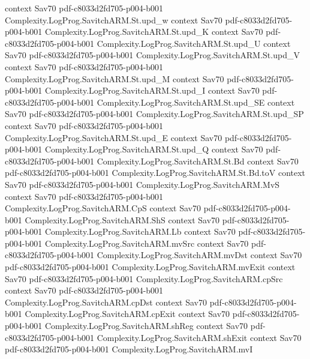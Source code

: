 \begin{theorem}
  {context}
  {Sav70}
  {pdf-c8033d2fd705-p004-b001}
\proofstep
  {Complexity.LogProg.SavitchARM.St.upd_w}
  {context}
  {Sav70}
  {pdf-c8033d2fd705-p004-b001}
\proofstep
  {Complexity.LogProg.SavitchARM.St.upd_K}
  {context}
  {Sav70}
  {pdf-c8033d2fd705-p004-b001}
\proofstep
  {Complexity.LogProg.SavitchARM.St.upd_U}
  {context}
  {Sav70}
  {pdf-c8033d2fd705-p004-b001}
\proofstep
  {Complexity.LogProg.SavitchARM.St.upd_V}
  {context}
  {Sav70}
  {pdf-c8033d2fd705-p004-b001}
\proofstep
  {Complexity.LogProg.SavitchARM.St.upd_M}
  {context}
  {Sav70}
  {pdf-c8033d2fd705-p004-b001}
\proofstep
  {Complexity.LogProg.SavitchARM.St.upd_I}
  {context}
  {Sav70}
  {pdf-c8033d2fd705-p004-b001}
\proofstep
  {Complexity.LogProg.SavitchARM.St.upd_SE}
  {context}
  {Sav70}
  {pdf-c8033d2fd705-p004-b001}
\proofstep
  {Complexity.LogProg.SavitchARM.St.upd_SP}
  {context}
  {Sav70}
  {pdf-c8033d2fd705-p004-b001}
\proofstep
  {Complexity.LogProg.SavitchARM.St.upd_E}
  {context}
  {Sav70}
  {pdf-c8033d2fd705-p004-b001}
\proofstep
  {Complexity.LogProg.SavitchARM.St.upd_Q}
  {context}
  {Sav70}
  {pdf-c8033d2fd705-p004-b001}
\proofstep
  {Complexity.LogProg.SavitchARM.St.Bd}
  {context}
  {Sav70}
  {pdf-c8033d2fd705-p004-b001}
\proofstep
  {Complexity.LogProg.SavitchARM.St.Bd.toV}
  {context}
  {Sav70}
  {pdf-c8033d2fd705-p004-b001}
\proofstep
  {Complexity.LogProg.SavitchARM.MvS}
  {context}
  {Sav70}
  {pdf-c8033d2fd705-p004-b001}
\proofstep
  {Complexity.LogProg.SavitchARM.CpS}
  {context}
  {Sav70}
  {pdf-c8033d2fd705-p004-b001}
\proofstep
  {Complexity.LogProg.SavitchARM.ShS}
  {context}
  {Sav70}
  {pdf-c8033d2fd705-p004-b001}
\proofstep
  {Complexity.LogProg.SavitchARM.Lb}
  {context}
  {Sav70}
  {pdf-c8033d2fd705-p004-b001}
\proofstep
  {Complexity.LogProg.SavitchARM.mvSrc}
  {context}
  {Sav70}
  {pdf-c8033d2fd705-p004-b001}
\proofstep
  {Complexity.LogProg.SavitchARM.mvDst}
  {context}
  {Sav70}
  {pdf-c8033d2fd705-p004-b001}
\proofstep
  {Complexity.LogProg.SavitchARM.mvExit}
  {context}
  {Sav70}
  {pdf-c8033d2fd705-p004-b001}
\proofstep
  {Complexity.LogProg.SavitchARM.cpSrc}
  {context}
  {Sav70}
  {pdf-c8033d2fd705-p004-b001}
\proofstep
  {Complexity.LogProg.SavitchARM.cpDst}
  {context}
  {Sav70}
  {pdf-c8033d2fd705-p004-b001}
\proofstep
  {Complexity.LogProg.SavitchARM.cpExit}
  {context}
  {Sav70}
  {pdf-c8033d2fd705-p004-b001}
\proofstep
  {Complexity.LogProg.SavitchARM.shReg}
  {context}
  {Sav70}
  {pdf-c8033d2fd705-p004-b001}
\proofstep
  {Complexity.LogProg.SavitchARM.shExit}
  {context}
  {Sav70}
  {pdf-c8033d2fd705-p004-b001}
\proofstep
  {Complexity.LogProg.SavitchARM.mvI}

\end{theorem}
